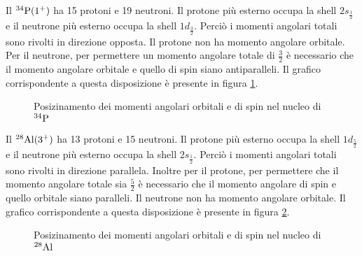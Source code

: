\documentclass[../main.tex]{subfiles}
\begin{document}
\begin{svol}
	
	Il $ ^{34}\mathrm{P}(1^{+}) $ ha 15 protoni e 19 neutroni. Il protone più esterno occupa la shell $ 2s_{\frac{1}{2}} $ e il neutrone più esterno occupa la shell $ 1d_{\frac{3}{2}} $. Perciò i momenti angolari totali sono rivolti in direzione opposta. Il protone non ha momento angolare orbitale. Per il neutrone, per permettere un momento angolare totale di $ \frac{3}{2} $ è necessario che il momento angolare orbitale e quello di spin siano antiparalleli. Il grafico corrispondente a questa disposizione è presente in figura \ref{fig:34P}.
	
	\begin{figure}[h]
		\centering
		\caption{Posizinamento dei momenti angolari orbitali e di spin nel nucleo di $ ^{34}\mathrm{P} $}\label{fig:34P}
	\end{figure}

	Il $ ^{28}\mathrm{Al}(3^{+}) $ ha 13 protoni e 15 neutroni. Il protone più esterno occupa la shell $ 1d_{\frac{5}{2}} $ e il neutrone più esterno occupa la shell $ 2s_{\frac{1}{2}} $. Perciò i momenti angolari totali sono rivolti in direzione parallela. Inoltre per il protone, per permettere che il momento angolare totale sia $ \frac{5}{2} $ è necessario che il momento angolare di spin e quello orbitale siano paralleli. Il neutrone non ha momento angolare orbitale. Il grafico corrispondente a questa disposizione è presente in figura \ref{fig:28Al}.
	
	\begin{figure}[h]
		\centering
		\caption{Posizinamento dei momenti angolari orbitali e di spin nel nucleo di $ ^{28}\mathrm{Al} $}\label{fig:28Al}
	\end{figure}
	

\end{svol}
\end{document}
